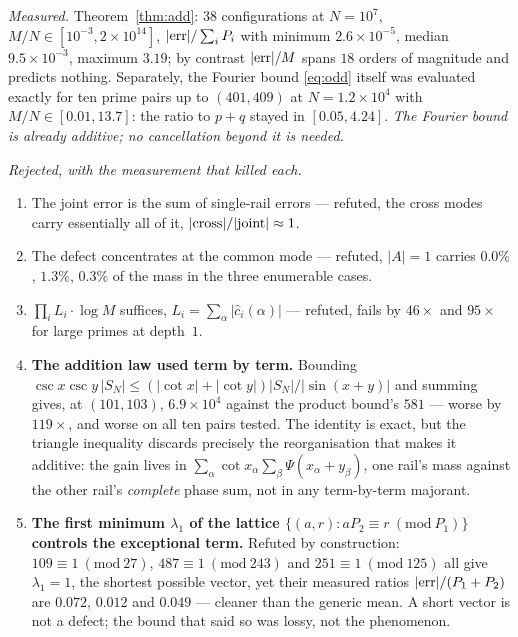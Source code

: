 \documentclass[11pt]{article}
\begin{document}
\emph{Measured.}  Theorem~\ref{thm:add}: $38$ configurations at $N=10^7$,
$M/N\in[10^{-3},2\times10^{14}]$, $|{\rm err}|/\sum_iP_i$ with minimum
$2.6\times10^{-5}$, median $9.5\times10^{-3}$, maximum $3.19$; by contrast
$|{\rm err}|/M$ spans $18$ orders of magnitude and predicts nothing.  Separately, the
Fourier bound \eqref{eq:odd} itself was evaluated exactly for ten prime pairs up to
$(401,409)$ at $N=1.2\times10^4$ with $M/N\in[0.01,13.7]$: the ratio to $p+q$ stayed in
$[0.05,4.24]$.  \emph{The Fourier bound is already additive; no cancellation beyond it
is needed.}

\emph{Rejected, with the measurement that killed each.}
\begin{enumerate}\itemsep2pt
\item The joint error is the sum of single-rail errors --- refuted, the cross modes
carry essentially all of it, $|{\rm cross}|/|{\rm joint}|\approx1$.
\item The defect concentrates at the common mode --- refuted, $|A|=1$ carries $0.0\%$,
$1.3\%$, $0.3\%$ of the mass in the three enumerable cases.
\item $\prod_iL_i\cdot\log M$ suffices, $L_i=\sum_\alpha|\hat c_i(\alpha)|$ --- refuted,
fails by $46\times$ and $95\times$ for large primes at depth~$1$.
\item \textbf{The addition law used term by term.}  Bounding
$\csc x\csc y\,|S_N|\le(|\cot x|+|\cot y|)|S_N|/|\sin(x+y)|$ and summing gives, at
$(101,103)$, $6.9\times10^4$ against the product bound's $581$ --- worse by $119\times$,
and worse on all ten pairs tested.  The identity is exact, but the triangle inequality
discards precisely the reorganisation that makes it additive: the gain lives in
$\sum_\alpha\cot x_\alpha\sum_\beta\Psi(x_\alpha+y_\beta)$, one rail's mass against the
other rail's \emph{complete} phase sum, not in any term-by-term majorant.
\item \textbf{The first minimum $\lambda_1$ of the lattice
$\{(a,r):aP_2\equiv r\ (\mathrm{mod}\ P_1)\}$ controls the exceptional term.}  Refuted
by construction: $109\equiv1\ (\mathrm{mod}\ 27)$, $487\equiv1\ (\mathrm{mod}\ 243)$ and
$251\equiv1\ (\mathrm{mod}\ 125)$ all give $\lambda_1=1$, the shortest possible vector,
yet their measured ratios $|{\rm err}|/(P_1+P_2)$ are $0.072$, $0.012$ and $0.049$ ---
cleaner than the generic mean.  A short vector is not a defect; the bound that said so
was lossy, not the phenomenon.
\end{enumerate}
\end{document}
